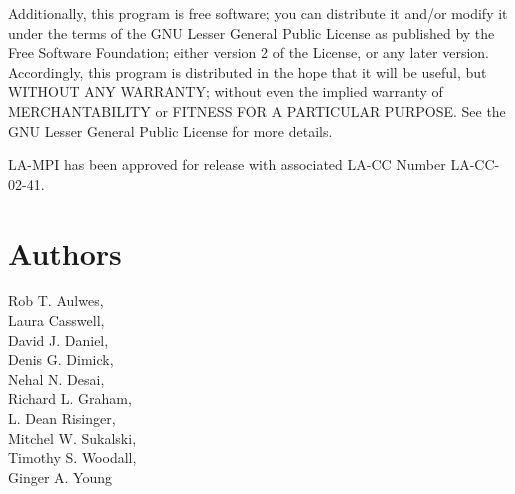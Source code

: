 \documentclass[english]{article}
\begin{document}
Additionally, this program is free software; you can distribute it
and/or modify it under the terms of the GNU Lesser General Public
License as published by the Free Software Foundation; either version 2
of the License, or any later version.  Accordingly, this program is
distributed in the hope that it will be useful, but WITHOUT ANY
WARRANTY; without even the implied warranty of MERCHANTABILITY or
FITNESS FOR A PARTICULAR PURPOSE.  See the GNU Lesser General Public
License for more details.

LA-MPI has been approved for release with associated LA-CC Number
LA-CC-02-41.

\section{Authors}
\noindent
Rob T. Aulwes, \\
Laura Casswell, \\
David J. Daniel, \\
Denis G. Dimick, \\
Nehal N. Desai, \\
Richard L. Graham, \\
L. Dean Risinger, \\
Mitchel W. Sukalski, \\
Timothy S. Woodall, \\
Ginger A. Young


\LatexManEnd
\end{document}
